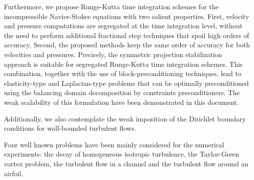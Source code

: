 Furthermore, we propose Runge-Kutta time integration schemes for the incompressible Navier-Stokes equations with two salient properties. First, velocity and pressure computations are segregated at the time integration level, without the need to perform additional fractional step techniques that spoil high orders of accuracy. Second, the proposed methods keep the same order of accuracy for both velocities and pressures. 
Precisely, the symmetric projection stabilization approach is suitable for segregated Runge-Kutta time integration schemes. This combination, together with the use of block-preconditioning techniques, lead to elasticity-type and Laplacian-type problems that can be optimally preconditioned using the balancing domain decomposition by constraints preconditioners. The weak scalability of this formulation have been demonstrated in this document.

Additionally, we also contemplate the weak imposition of the Dirichlet boundary conditions for wall-bounded turbulent flows.

Four well known problems have been mainly considered for the numerical experiments: the decay of homogeneous isotropic turbulence, the Taylor-Green vortex problem, the turbulent flow in a channel and the turbulent flow around an airfoil.